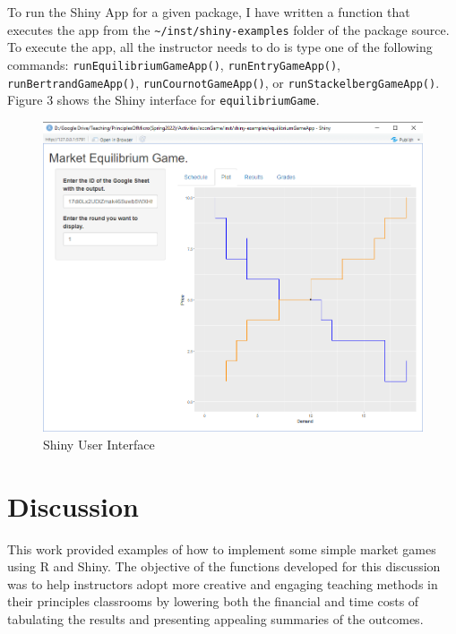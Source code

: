 \documentclass[
]{article}
\begin{document}
To run the Shiny App for a given package, I have written a function that
executes the app from the
\texttt{\textquotesingle{}\textasciitilde{}/inst/shiny-examples\textquotesingle{}}
folder of the package source. To execute the app, all the instructor
needs to do is type one of the following commands:
\texttt{\textquotesingle{}runEquilibriumGameApp()\textquotesingle{}},
\texttt{\textquotesingle{}runEntryGameApp()\textquotesingle{}},
\texttt{\textquotesingle{}runBertrandGameApp()\textquotesingle{}},
\texttt{\textquotesingle{}runCournotGameApp()\textquotesingle{}}, or
\texttt{\textquotesingle{}runStackelbergGameApp()\textquotesingle{}}.
Figure 3 shows the Shiny interface for \texttt{equilibriumGame}.

\begin{figure}
\centering
\includegraphics{Figure3.png}
\caption{Shiny User Interface}
\end{figure}

\hypertarget{discussion}{%
\section{Discussion}\label{discussion}}

This work provided examples of how to implement some simple market games
using R and Shiny. The objective of the functions developed for this
discussion was to help instructors adopt more creative and engaging
teaching methods in their principles classrooms by lowering both the
financial and time costs of tabulating the results and presenting
appealing summaries of the outcomes.
\end{document}
